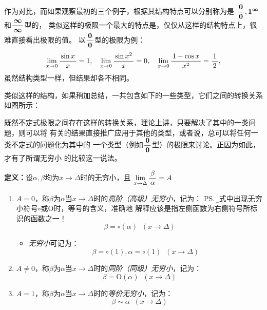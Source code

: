 作为对比，而如果观察最初的三个例子，根据其结构特点可以分别称为是
$\displaystyle\frac{\,{\bm0}\,}{\,{\bm0}\,},\bm{1^{\infty}}$和$\displaystyle\frac{\,{\bm{\infty}}\,}{\,{\bm{\infty}}\,}$型的，
类似这样的极限一个最大的特点是，仅仅从这样的结构特点上，很难直接看出极限的值。
以$\displaystyle\frac{\,{\bm0}\,}{\,{\bm0}\,}$型的极限为例：
$$\lim\limits_{x\to{0}}\displaystyle\frac{\,{\sin x}\,}{\,{x}\,}=1,
\quad \lim\limits_{x\to{0}}\displaystyle\frac{\,{\sin x^2}\,}{\,{x}\,}=0,
\quad \lim\limits_{x\to{0}}\displaystyle\frac{\,{1-\cos x}\,}{\,{x^2}\,}=\displaystyle\frac{\,{1}\,}{\,{2}\,},$$
虽然结构类型一样，但结果却各不相同。

类似这样的结构，如果稍加总结，一共包含如下的一些类型，它们之间的转换关系如图所示：

\begin{center}
\end{center}

既然不定式极限之间存在这样的转换关系，理论上讲，只要解决了其中的一类问题，则可以将
有关的结果直接推广应用于其他的类型，或者说，总可以将任何一类不定式的问题化为其中的
一个类型（例如$\displaystyle\frac{\,{\bm0}\,}{\,{\bm0}\,}$型）的极限来讨论。正因为如此，才有了所谓无穷小
的比较这一说法。

{\bf 定义：}设$\alpha,\beta$均为$x\to\Delta$时的无穷小，且
$\lim\limits_{x\to{\Delta}}\displaystyle\frac{\,{\beta}\,}{\,{\alpha}\,}=A$
\begin{enumerate}[(1)]
  \setlength{\itemindent}{1cm}
  \item $A=0$，称$\beta$为$\alpha$当$x\to\Delta$时的{\it 高阶（高级）无穷小}，记为：
  \ps{\b 等式中出现无穷小符号$\circ$或$\mathrm{O}$时，等号的含义，准确地
  解释应该是指左侧函数为右侧符号所标识的函数之一！}
  $$\beta=\circ(\alpha)\;\;(x\to\Delta)$$
  \begin{itemize}
    \item {\it 无穷小}可记为：
    $$\beta=\circ(1),\alpha=\circ(1)\;\;(x\to\Delta)$$
  \end{itemize}
  \item $A\ne 0$，称$\beta$为$\alpha$当$x\to\Delta$时的{\it 同阶（同级）无穷小}，记为：
  $$\beta=\mathrm{O}(\alpha)\;\;(x\to\Delta)$$
  \item $A=1$，称$\beta$为$\alpha$当$x\to\Delta$时的{\it 等价无穷小}，记为：
  $$\beta\sim \alpha\;\;(x\to\Delta)$$
\end{enumerate}

